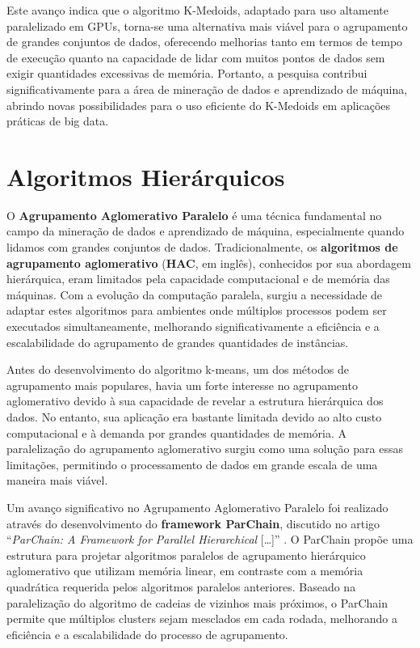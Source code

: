 \documentclass[12pt,
openright, 
oneside, %
a4paper,    %
brazil]{facom-ufu-abntex2}
\begin{document}
Este avanço indica que o algoritmo K-Medoids, adaptado para uso altamente paralelizado em GPUs, torna-se uma alternativa mais viável para o agrupamento de grandes conjuntos de dados, oferecendo melhorias tanto em termos de tempo de execução quanto na capacidade de lidar com muitos pontos de dados sem exigir quantidades excessivas de memória. Portanto, a pesquisa contribui significativamente para a área de mineração de dados e aprendizado de máquina, abrindo novas possibilidades para o uso eficiente do K-Medoids em aplicações práticas de big data.




\section{Algoritmos Hierárquicos}

O \textbf{Agrupamento Aglomerativo Paralelo} é uma técnica fundamental no campo da mineração de dados e aprendizado de máquina, especialmente quando lidamos com grandes conjuntos de dados. Tradicionalmente, os \textbf{algoritmos de agrupamento aglomerativo} (\textbf{HAC}, em inglês), conhecidos por sua abordagem hierárquica, eram limitados pela capacidade computacional e de memória das máquinas. Com a evolução da computação paralela, surgiu a necessidade de adaptar estes algoritmos para ambientes onde múltiplos processos podem ser executados simultaneamente, melhorando significativamente a eficiência e a escalabilidade do agrupamento de grandes quantidades de instâncias.

Antes do desenvolvimento do algoritmo k-means, um dos métodos de agrupamento mais populares, havia um forte interesse no agrupamento aglomerativo devido à sua capacidade de revelar a estrutura hierárquica dos dados. No entanto, sua aplicação era bastante limitada devido ao alto custo computacional e à demanda por grandes quantidades de memória. A paralelização do agrupamento aglomerativo surgiu como uma solução para essas limitações, permitindo o processamento de dados em grande escala de uma maneira mais viável.

Um avanço significativo no Agrupamento Aglomerativo Paralelo foi realizado através do desenvolvimento do \textbf{framework ParChain}, discutido no artigo \enquote{\textit{ParChain: A Framework for Parallel Hierarchical} [\dots]} \cite{parChainHAC2021}. O ParChain propõe uma estrutura para projetar algoritmos paralelos de agrupamento hierárquico aglomerativo que utilizam memória linear, em contraste com a memória quadrática requerida pelos algoritmos paralelos anteriores. Baseado na paralelização do algoritmo de cadeias de vizinhos mais próximos, o ParChain permite que múltiplos clusters sejam mesclados em cada rodada, melhorando a eficiência e a escalabilidade do processo de agrupamento.
\end{document}
